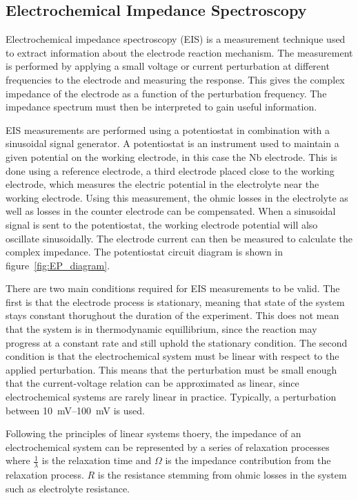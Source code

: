 \subsection{Electrochemical Impedance Spectroscopy}


Electrochemical impedance spectroscopy (EIS) is a measurement technique used to extract information about the electrode reaction mechanism. The measurement is performed by applying a small voltage or current perturbation at different frequencies to the electrode and measuring the response. This gives the complex impedance of the electrode as a function of the perturbation frequency. The impedance spectrum must then be interpreted to gain useful information.

EIS measurements are performed using a potentiostat in combination with a sinusoidal signal generator. A potentiostat is an instrument used to maintain a given potential on the working electrode, in this case the Nb electrode. This is done using a reference electrode, a third electrode placed close to the working electrode, which measures the electric potential in the electrolyte near the working electrode. Using this measurement, the ohmic losses in the electrolyte as well as losses in the counter electrode can be compensated. When a sinusoidal signal is sent to the potentiostat, the working electrode potential will also oscillate sinusoidally. The electrode current can then be measured to calculate the complex impedance. The potentiostat circuit diagram is shown in figure~\ref{fig:EP_diagram}.

There are two main conditions required for EIS measurements to be valid. The first is that the electrode process is stationary, meaning that state of the system stays constant thorughout the duration of the experiment. This does not mean that the system is in thermodynamic equillibrium, since the reaction may progress at a constant rate and still uphold the stationary condition. The second condition is that the electrochemical system must be linear with respect to the applied perturbation. This means that the perturbation must be small enough that the current-voltage relation can be approximated as linear, since electrochemical systems are rarely linear in practice. Typically, a perturbation between \qtyrange{10}{100}{\milli\volt} is used.

Following the principles of linear systems thoery, the impedance of an electrochemical system can be represented by a series of relaxation processes where $\frac{1}{\lambda}$ is the relaxation time and $\Omega$ is the impedance contribution from the relaxation process. $R$ is the resistance stemming from ohmic losses in the system such as electrolyte resistance.

